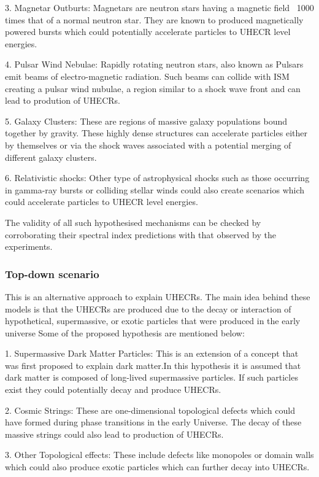 3. Magnetar Outburts: Magnetars are neutron stars having a magnetic field ~1000 times that of a normal neutron star. They are known to produced magnetically powered bursts which could potentially accelerate particles to UHECR level energies.

4. Pulsar Wind Nebulae: Rapidly rotating neutron stars, also known as Pulsars emit beams of electro-magnetic radiation. Such beams can collide with ISM creating a pulsar wind nubulae, a region similar to a shock wave front and can lead to prodution of UHECRs.

5. Galaxy Clusters: These are regions of massive galaxy populations bound together by gravity. These highly dense structures can accelerate particles either by themselves or via the shock waves associated with a potential merging of different galaxy clusters. 

6. Relativistic shocks: Other type of astrophysical shocks such as those occurring in gamma-ray bursts or colliding stellar winds could also create scenarios which could accelerate particles to UHECR level energies.

The validity of all such hypothesised mechanisms can be checked by corroborating their spectral index predictions with that observed by the experiments. 

\subsubsection{Top-down scenario}
This is an alternative approach to explain UHECRs. The main idea behind these models is that the UHECRs are produced due to the decay or interaction of hypothetical, supermassive, or exotic particles that were produced in the early universe Some of the proposed hypothesis are mentioned below:


1. Supermassive Dark Matter Particles: This is an extension of a concept that was first proposed to explain dark matter.In this hypothesis it is assumed that dark matter is composed of long-lived supermassive particles. If such particles exist they could potentially decay and produce UHECRs.

2. Cosmic Strings: These are one-dimensional topological defects which could have formed during phase transitions in the early Universe. The decay of these massive strings could also lead to production of UHECRs.

3. Other Topological effects: These include defects like monopoles or domain walls which could also produce exotic particles which can further decay into UHECRs. 

